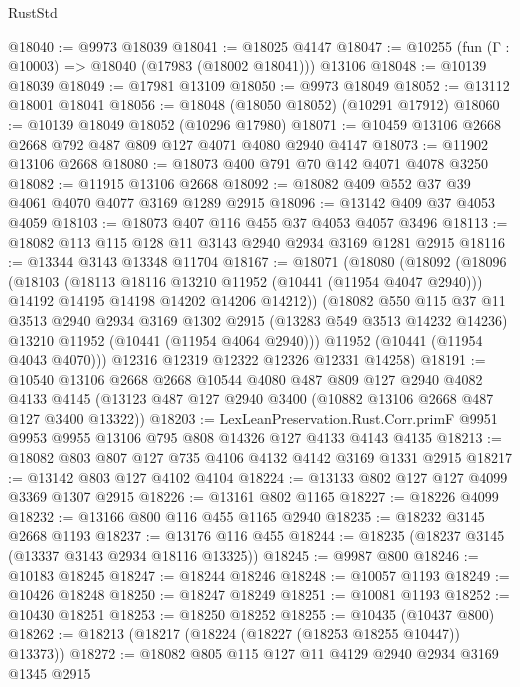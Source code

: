 \begin{lexlean}{RustStd}
\begin{coremodule}
@18040 := @9973 @18039
@18041 := @18025 @4147
@18047 := @10255 (fun (Γ : @10003) => @18040 (@17983 (@18002 @18041))) @13106
@18048 := @10139 @18039
@18049 := @17981 @13109
@18050 := @9973 @18049
@18052 := @13112 @18001 @18041
@18056 := @18048 (@18050 @18052) (@10291 @17912)
@18060 := @10139 @18049 @18052 (@10296 @17980)
@18071 := @10459 @13106 @2668 @2668 @792 @487 @809 @127 @4071 @4080 @2940 @4147
@18073 := @11902 @13106 @2668
@18080 := @18073 @400 @791 @70 @142 @4071 @4078 @3250
@18082 := @11915 @13106 @2668
@18092 := @18082 @409 @552 @37 @39 @4061 @4070 @4077 @3169 @1289 @2915
@18096 := @13142 @409 @37 @4053 @4059
@18103 := @18073 @407 @116 @455 @37 @4053 @4057 @3496
@18113 := @18082 @113 @115 @128 @11 @3143 @2940 @2934 @3169 @1281 @2915
@18116 := @13344 @3143 @13348 @11704
@18167 := @18071
    (@18080
      (@18092
        (@18096
          (@18103
            (@18113 @18116 @13210 @11952 (@10441 (@11954 @4047 @2940)))
            @14192
            @14195
            @14198
            @14202
            @14206
            @14212))
        (@18082
          @550
          @115
          @37
          @11
          @3513
          @2940
          @2934
          @3169
          @1302
          @2915
          (@13283 @549 @3513 @14232 @14236)
          @13210
          @11952
          (@10441 (@11954 @4064 @2940)))
        @11952
        (@10441 (@11954 @4043 @4070)))
      @12316
      @12319
      @12322
      @12326
      @12331
      @14258)
@18191 := @10540
    @13106
    @2668
    @2668
    @10544
    @4080
    @487
    @809
    @127
    @2940
    @4082
    @4133
    @4145
    (@13123 @487 @127 @2940 @3400 (@10882 @13106 @2668 @487 @127 @3400 @13322))
@18203 := LexLeanPreservation.Rust.Corr.primF
    @9951
    @9953
    @9955
    @13106
    @795
    @808
    @14326
    @127
    @4133
    @4143
    @4135
@18213 := @18082 @803 @807 @127 @735 @4106 @4132 @4142 @3169 @1331 @2915
@18217 := @13142 @803 @127 @4102 @4104
@18224 := @13133 @802 @127 @127 @4099 @3369 @1307 @2915
@18226 := @13161 @802 @1165
@18227 := @18226 @4099
@18232 := @13166 @800 @116 @455 @1165 @2940
@18235 := @18232 @3145 @2668 @1193
@18237 := @13176 @116 @455
@18244 := @18235 (@18237 @3145 (@13337 @3143 @2934 @18116 @13325))
@18245 := @9987 @800
@18246 := @10183 @18245
@18247 := @18244 @18246
@18248 := @10057 @1193
@18249 := @10426 @18248
@18250 := @18247 @18249
@18251 := @10081 @1193
@18252 := @10430 @18251
@18253 := @18250 @18252
@18255 := @10435 (@10437 @800)
@18262 := @18213 (@18217 (@18224 (@18227 (@18253 @18255 @10447)) @13373))
@18272 := @18082 @805 @115 @127 @11 @4129 @2940 @2934 @3169 @1345 @2915

\end{coremodule}
\end{lexlean}
